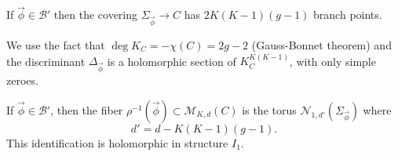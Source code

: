 \documentclass[12pt,letterpaper,reqno]{article}
\numberwithin{equation}{section}
\newcommand{\cB}{\ensuremath{\mathcal B}}
\newcommand{\cM}{\ensuremath{\mathcal M}}
\newcommand{\cN}{\ensuremath{\mathcal N}}
\begin{document}

\begin{prop}
If $\vec\phi \in \cB'$ then the covering $\Sigma_{\vec\phi} \to C$ has $2K(K-1)(g-1)$ branch points.
\end{prop}
\begin{pf} We use the fact that $\deg K_C = - \chi(C) = 2g-2$
(Gauss-Bonnet theorem)
and the discriminant $\Delta_{\vec\phi}$ is a holomorphic section of 
$K_C^{K(K-1)}$, with only simple zeroes.
\end{pf}

\begin{prop} \label{prop:hitchin-fibers-are-jacobians}
If $\vec\phi \in \cB'$, then
the fiber $\rho^{-1}(\vec\phi) \subset \cM_{K,d}(C)$ 
is the torus $\cN_{1,d'}(\Sigma_{\vec\phi})$
where
\begin{equation}
	d' = d - K(K-1)(g-1).
\end{equation}
This identification is holomorphic in structure $I_1$.
\end{prop}
\end{document}
